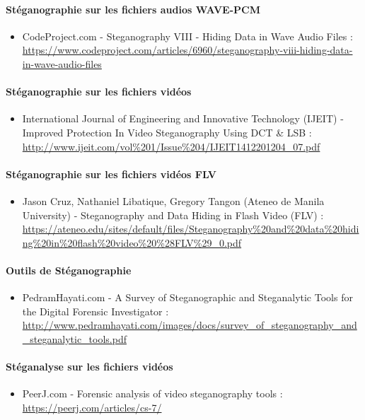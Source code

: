 \documentclass[11pt]{article}
\begin{document}
\paragraph{Stéganographie sur les fichiers audios WAVE-PCM}
\begin{itemize}
\item CodeProject.com - Steganography VIII - Hiding Data in Wave Audio Files : \\
    \url{https://www.codeproject.com/articles/6960/steganography-viii-hiding-data-in-wave-audio-files}
\end{itemize}

\paragraph{Stéganographie sur les fichiers vidéos}
\begin{itemize}
    \item International Journal of Engineering and Innovative Technology (IJEIT)
    - Improved Protection In Video Steganography Using DCT \& LSB : \\
    \url{http://www.ijeit.com/vol%201/Issue%204/IJEIT1412201204_07.pdf}
\end{itemize}

\paragraph{Stéganographie sur les fichiers vidéos FLV}
\begin{itemize}
    \item Jason Cruz, Nathaniel Libatique, Gregory Tangon (Ateneo de Manila
    University) - Steganography and Data Hiding in Flash Video (FLV) : \\
    \url{https://ateneo.edu/sites/default/files/Steganography%20and%20data%20hiding%20in%20flash%20video%20%28FLV%29_0.pdf}
\end{itemize}

\paragraph{Outils de Stéganographie}
\begin{itemize}
\item PedramHayati.com - A Survey of Steganographic and Steganalytic Tools for the Digital Forensic Investigator : \\
    \url{http://www.pedramhayati.com/images/docs/survey_of_steganography_and_steganalytic_tools.pdf}
\end{itemize}

\paragraph{Stéganalyse sur les fichiers vidéos}
\begin{itemize}
\item PeerJ.com - Forensic analysis of video steganography tools : \\
    \url{https://peerj.com/articles/cs-7/}
\end{itemize}
\end{document}
